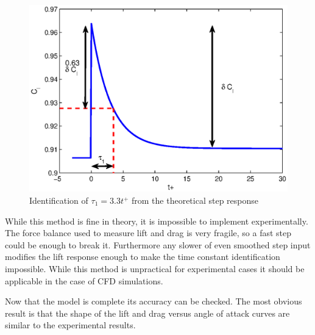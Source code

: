 \begin{figure}[h]
  \centering
  \includegraphics{./Figures/tau_1_Cl_vs_tplus_step_12to13.eps}
  \caption{Identification of $\tau_1=3.3t^+$ from the theoretical step response}
  \label{fig:tau_1_identification}
\end{figure}	

\FloatBarrier

\par While this method is fine in theory, it is impossible to implement experimentally.
The force balance used to measure lift and drag is very fragile, so a fast step could be enough to break it.
Furthermore any slower of even smoothed step input modifies the lift response enough to make the time constant identification impossible.
While this method is unpractical for experimental cases it should be applicable in the case of CFD simulations.

Now that the model is complete its accuracy can be checked.
The most obvious result is that the shape of the lift and drag versus angle of attack curves are similar to the experimental results.

